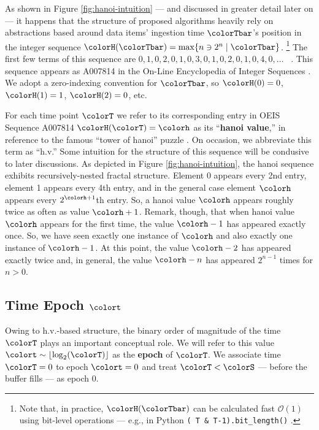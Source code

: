 

As shown in Figure \ref{fig:hanoi-intuition} --- and discussed in greater detail later on --- it happens that the structure of proposed algorithms heavily rely on abstractions based around data items' ingestion time $\colorTbar$'s position in the integer sequence $\colorH(\colorTbar) = \max \{ n \ni 2^n \mid \colorTbar \}$.%
\footnote{%
Note that, in practice, $\colorH(\colorTbar)$ can be calculated fast $\mathcal{O}(1)$ using bit-level operations --- e.g., in Python \texttt{(~T \& T-1).bit\_length()} \citep{oeis}.
}
The first few terms of this sequence are $0,\allowbreak 1,\allowbreak 0,\allowbreak 2,\allowbreak 0,\allowbreak 1,\allowbreak 0,\allowbreak 3,\allowbreak 0,\allowbreak 1,\allowbreak 0,\allowbreak 2,\allowbreak 0,\allowbreak 1,\allowbreak 0,\allowbreak 4,\allowbreak 0,\allowbreak \ldots$ \, .
This sequence appears as A007814 in the On-Line Encyclopedia of Integer Sequences \citep{oeis}.
We adopt a zero-indexing convention for $\colorTbar$, so $\colorH(0) = 0$, $\colorH(1) = 1$, $\colorH(2) = 0$, etc.

For each time point $\colorT$ we refer to its corresponding entry in OEIS Sequence A007814 $\colorH(\colorT) = \colorh$ as its ``\textbf{hanoi value},'' in reference to the famous ``tower of hanoi'' puzzle \citep{lucas1889jeux}.
On occasion, we abbreviate this term as ``h.v.''
Some intuition for the structure of this sequence will be condusive to later discussions.
As depicted in Figure \ref{fig:hanoi-intuition}, the hanoi sequence exhibits recursively-nested fractal structure.
Element 0 appears every 2nd entry, element 1 appears every 4th entry, and in the general case element $\colorh$ appears every $2^{\colorh+1}$th entry.
So, a hanoi value $\colorh$ appears roughly twice as often as value $\colorh + 1$.
Remark, though, that when hanoi value $\colorh$ appears for the first time, the value $\colorh - 1$ has appeared exactly once.
So, we have seen exactly one instance of $\colorh$ and also exactly one instance of $\colorh - 1$.
At this point, the value $\colorh - 2$ has appeared exactly twice and, in general, the value $\colorh - n$ has appeared $2^{n - 1}$ times for $n > 0$.

\subsection{Time Epoch $\colort$}
\label{sec:notation-epoch}

Owing to h.v.-based structure, the binary order of magnitude of the time $\colorT$ plays an important conceptual role.
We will refer to this value $\colort \sim \left\lfloor \log_2(\colorT) \right\rfloor$ as the \textbf{epoch} of $\colorT$.
We associate time $\colorT=0$ to epoch $\colort=0$ and treat $\colorT < \colorS$ --- before the buffer fills --- as epoch 0.

